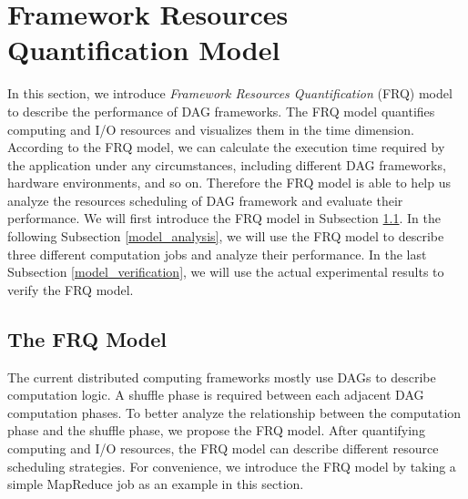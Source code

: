 {\color{blue}
\section{Framework Resources Quantification Model}\label{model}

In this section, we introduce \textit{Framework Resources Quantification} (FRQ) model to describe the performance of DAG frameworks.
The FRQ model quantifies computing and I/O resources and visualizes them in the time dimension. According to the FRQ model, we can calculate the execution time required by the application under any circumstances, including different DAG frameworks, hardware environments, and so on. Therefore the FRQ model is able to help us analyze the resources scheduling of DAG framework and evaluate their performance. We will first introduce the FRQ model in Subsection \ref{model_overview}. In the following Subsection \ref{model_analysis}, we will use the FRQ model to describe three different computation jobs and analyze their performance. In the last Subsection \ref{model_verification}, we will use the actual experimental results to verify the FRQ model.

\subsection{The FRQ Model}\label{model_overview}
The current distributed computing frameworks mostly use DAGs to describe computation logic. 
A shuffle phase is required between each adjacent DAG computation phases. To better analyze the relationship between the computation phase and the shuffle phase, we propose the FRQ model. After quantifying computing and I/O resources, the FRQ model can describe different resource scheduling strategies. For convenience, we introduce the FRQ model by taking a simple MapReduce job as an example in this section.

}
